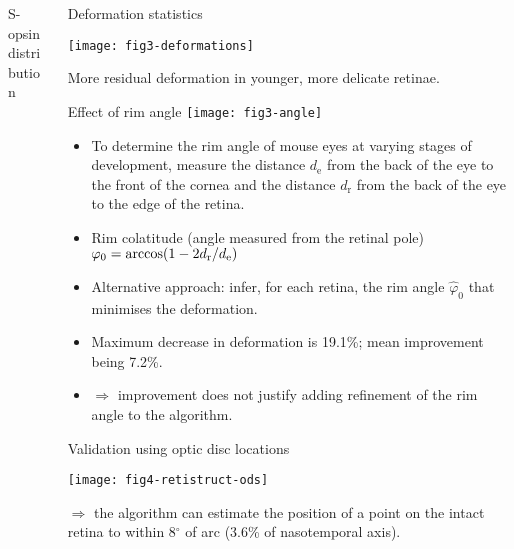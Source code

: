 \documentclass[final]{beamer}
\begin{document}
\begin{frame}{}
\begin{columns}[T]
\begin{column}{.37\linewidth}
\begin{block}{S-opsin distribution}
      \end{block}



    \end{column}

    \begin{column}{.25\linewidth}


      \begin{block}{Deformation statistics}

        \texttt{[image: fig3-deformations]}     
        
        More residual deformation in younger, more delicate retinae.

      \end{block}

      \begin{block}{Effect of rim angle}
        \texttt{[image: fig3-angle]}     
        \begin{itemize}
        \item To determine the rim angle of mouse eyes at varying
          stages of development, measure the distance $d_\mathrm{e}$
          from the back of the eye to the front of the cornea and the
          distance $d_\mathrm{r}$ from the back of the eye to the edge
          of the retina.
        \item Rim colatitude (angle measured from the retinal pole)
          $\varphi _0=\arccos (1-2d_{\text r}/d_{\text e})$
        \item Alternative approach: infer, for each retina, the rim
          angle $\hat\varphi _0$ that minimises the deformation.
        \item Maximum decrease in deformation is 19.1\%; mean
          improvement being 7.2\%.
        \item $\Rightarrow$ improvement does not justify adding
          refinement of the rim angle to the algorithm.
        \end{itemize}
      \end{block}

      \begin{block}{Validation using optic disc locations}


        \texttt{[image: fig4-retistruct-ods]}     

        $\Rightarrow$ the algorithm can estimate the position of a
        point on the intact retina to within 8$^{\circ}$ of arc (3.6\%
        of nasotemporal axis).
      \end{block}


\end{column}
\end{columns}
\end{frame}
\end{document}
